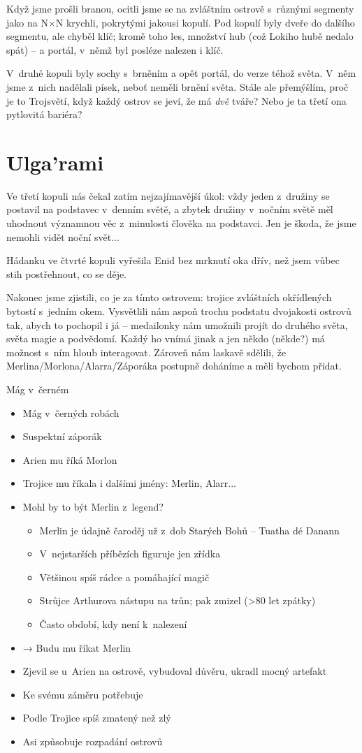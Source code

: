 \documentclass[a4paper,twocolumn,openany,nodeprecatedcode, justified]{dndbook}
\newcommand{\bi}{\begin{itemize}}
\newcommand{\ei}{\end{itemize}}
\begin{document}
	Když jsme prošli branou, ocitli jsme se na zvláštním ostrově s~různými segmenty jako na N$\times$N krychli, pokrytými jakousi kopulí. Pod kopulí byly dveře do dalšího segmentu, ale chyběl klíč; kromě toho les, množství hub (což Lokiho hubě nedalo spát) -- a portál, v~němž byl posléze nalezen i klíč.	
	
	V~druhé kopuli byly sochy s~brněním a opět portál, do  verze téhož světa. V~něm jsme z~nich nadělali písek, neboť neměli brnění  světa. Stále ale přemýšlím, proč je to Trojsvětí, když každý ostrov se jeví, že má \emph{dvě} tváře? Nebo je ta třetí ona pytlovitá bariéra?
	
	\section[Sezení 4]{Ulga'rami}
	Ve třetí kopuli nás čekal zatím nejzajímavější úkol: vždy jeden z~družiny se postavil na podstavec v~denním světě, a zbytek družiny v~nočním světě měl uhodnout významnou věc z~minulosti člověka na podstavci. Jen je škoda, že jsme nemohli vidět  noční svět...
	
	Hádanku ve čtvrté kopuli vyřešila Enid bez mrknutí oka dřív, než jsem vůbec stih postřehnout, co se děje.
	
	Nakonec jsme zjistili, co je za tímto ostrovem: trojice zvláštních okřídlených bytostí s~jedním okem. Vysvětlili nám aspoň trochu podstatu dvojakosti ostrovů tak, abych to pochopil i já -- medailonky nám umožnili projít do druhého světa, světa magie a podvědomí. Každý ho vnímá jinak a jen někdo (někde?) má možnost s~ním hloub interagovat. Zároveň nám laskavě sdělili, že Merlina/Morlona/Alarra/Záporáka postupně doháníme a měli bychom přidat.
	
	\begin{DndComment}{Mág v~černém}
		\sffamily
		\bi
		\item Mág v~černých robách
		\item Suspektní záporák
		\item Arien mu říká Morlon
		\item Trojice mu říkala i dalšími jmény: Merlin, Alarr...
		\item Mohl by to být Merlin z~legend?
			\bi
			\item Merlin je údajně čaroděj už z~dob Starých Bohů -- Tuatha dé Danann
			\item V~nejstarších příbězích figuruje jen zřídka
			\item Většinou spíš rádce a pomáhající magič
			\item Strůjce Arthurova nástupu na trůn; pak zmizel (>80 let zpátky)
			\item Často období, kdy není k~nalezení
			\ei
		\item[→] Budu mu říkat Merlin
		\item Zjevil se u~Arien na ostrově, vybudoval důvěru, ukradl mocný artefakt
		\item Ke svému záměru potřebuje 
		\item Podle Trojice spíš zmatený než zlý
		\item Asi způsobuje rozpadání ostrovů
		\ei
	\end{DndComment}
	
\end{document}
